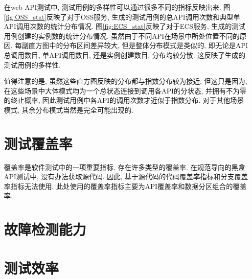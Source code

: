         在web API测试中, 测试用例的多样性可以通过很多不同的指标反映出来. 图\ref{fig:OSS_stat}反映了对于OSS服务, 生成的测试用例的总API调用次数和典型单API调用次数的统计分布情况. 图\ref{fig:ECS_stat}反映了对于ECS服务, 生成的测试用例创建的实例数的统计分布情况. 虽然由于不同API在场景中所处位置不同的原因, 每副直方图中的分布区间差异较大, 但是整体分布模式是类似的, 即无论是API总调用数目, 单API调用数目, 还是实例创建数目, 分布均较分散. 这反映了生成的测试用例的多样性.
        
        值得注意的是, 虽然这些直方图反映的分布都与指数分布较为接近, 但这只是因为, 在这些场景中大体模式均为一个总状态连接到调用各API的分状态, 并拥有不为零的终止概率, 因此测试用例中各API的调用次数才近似于指数分布. 对于其他场景模式, 其余分布模式当然是完全可能出现的.

    \section{测试覆盖率}
        覆盖率是软件测试中的一项重要指标. 存在许多类型的覆盖率. 在规范导向的黑盒API测试中, 没有办法获取源代码. 因此, 基于源代码的代码覆盖率指标和分支覆盖率指标无法使用. 此处使用的覆盖率指标主要为API覆盖率和数据分区组合的覆盖率.
        
        
    
    \section{故障检测能力}
    
    \section{测试效率}

